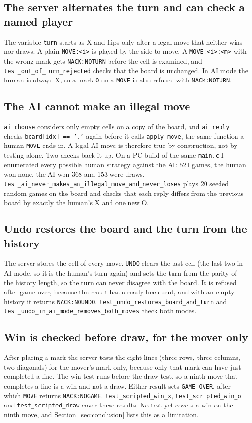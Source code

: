 \subsection{The server alternates the turn and can check a named player}
The variable \texttt{turn} starts as X and flips only after a legal move that
neither wins nor draws. A plain \texttt{MOVE:<i>} is played by the side to move.
A \texttt{MOVE:<i>:<m>} with the wrong mark gets \texttt{NACK:NOTURN} before the
cell is examined, and \texttt{test\_out\_of\_turn\_rejected} checks that the board
is unchanged. In AI mode the human is always X, so a mark \texttt{O} on a
\texttt{MOVE} is also refused with \texttt{NACK:NOTURN}.

\subsection{The AI cannot make an illegal move}
\texttt{ai\_choose} considers only empty cells on a copy of the board, and
\texttt{ai\_reply} checks \texttt{board[idx] == '.'} again before it calls
\texttt{apply\_move}, the same function a human \texttt{MOVE} ends in. A legal AI
move is therefore true by construction, not by testing alone. Two checks back it
up. On a PC build of the same \texttt{main.c} I enumerated every possible human
strategy against the AI: 521 games, the human won none, the AI won 368 and 153
were draws.
\texttt{test\_ai\_never\_makes\_an\_illegal\_move\_and\_never\_loses} plays 20
seeded random games on the board and checks that each reply differs from the
previous board by exactly the human's X and one new O.

\subsection{Undo restores the board and the turn from the history}
The server stores the cell of every move. \texttt{UNDO} clears the last cell (the
last two in AI mode, so it is the human's turn again) and sets the turn from the
parity of the history length, so the turn can never disagree with the board. It
is refused after game over, because the result has already been sent, and with an
empty history it returns \texttt{NACK:NOUNDO}. \texttt{test\_undo\_restores\_board\_and\_turn}
and \texttt{test\_undo\_in\_ai\_mode\_removes\_both\_moves} check both modes.

\subsection{Win is checked before draw, for the mover only}
After placing a mark the server tests the eight lines (three rows, three columns,
two diagonals) for the mover's mark only, because only that mark can have just
completed a line. The win test runs before the draw test, so a ninth move that
completes a line is a win and not a draw. Either result sets
\texttt{GAME\_OVER}, after which \texttt{MOVE} returns \texttt{NACK:NOGAME}.
\texttt{test\_scripted\_win\_x}, \texttt{test\_scripted\_win\_o} and
\texttt{test\_scripted\_draw} cover these results. No test yet covers a win on the
ninth move, and Section~\ref{sec:conclusion} lists this as a limitation.

